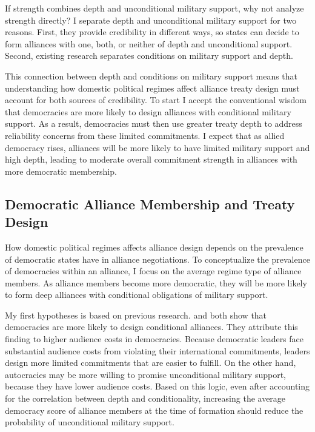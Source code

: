 \documentclass[12pt]{article}
\begin{document}
If strength combines depth and unconditional military support, why not analyze strength directly? 
I separate depth and unconditional military support for two reasons. 
First, they provide credibility in different ways, so states can decide to form alliances with one, both, or neither of depth and unconditional support.  
Second, existing research separates conditions on military support and depth. 


This connection between depth and conditions on military support means that understanding how domestic political regimes affect alliance treaty design must account for both sources of credibility.  
To start I accept the conventional wisdom that democracies are more likely to design alliances with conditional military support. 
As a result, democracies must then use greater treaty depth to address reliability concerns from these limited commitments.
I expect that as allied democracy rises, alliances will be more likely to have limited military support and high depth, leading to moderate overall commitment strength in alliances with more democratic membership. 


\subsection{Democratic Alliance Membership and Treaty Design}


How domestic political regimes affects alliance design depends on the prevalence of democratic states have in alliance negotiations. 
To conceptualize the prevalence of democracies within an alliance, I focus on the average regime type of alliance members. 
As alliance members become more democratic, they will be more likely to form deep alliances with conditional obligations of military support. 


My first hypotheses is based on previous research.  
\citet{Mattes2012} and \citet{Chibaetal2015} both show that democracies are more likely to design conditional alliances. 
They attribute this finding to higher audience costs in democracies. 
Because democratic leaders face substantial audience costs from violating their international commitments, leaders design more limited commitments that are easier to fulfill. 
On the other hand, autocracies may be more willing to promise unconditional military support, because they have lower audience costs. 
Based on this logic, even after accounting for the correlation between depth and conditionality, increasing the average democracy score of alliance members at the time of formation should reduce the probability of unconditional military support.
\end{document}

